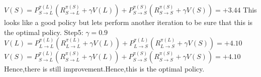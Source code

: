 \documentclass{article}
\begin{document}
$V(S)=P_{S\to L}^{\pi(L)}(R_{S\to L}^{\pi(S)}+\gamma V(L))+P_{S\to S}^{\pi(S)}(R_{S\to S}^{\pi(S)}+\gamma V(S))=+3.44$\newline\newline
This looks like a good policy but lets perform another iteration to be sure that this is the optimal policy.\newline\newline
Step5: $\gamma=0.9$\newline\newline
$V(L)=P_{L\to L}^{\pi(L)}(R_{L\to L}^{\pi(L)}+\gamma V(L))+P_{L\to S}^{\pi(L)}(R_{L\to S}^{\pi(L)}+\gamma V(S))=+4.10$\newline\newline
$V(S)=P_{S\to L}^{\pi(L)}(R_{S\to L}^{\pi(S)}+\gamma V(L))+P_{S\to S}^{\pi(S)}(R_{S\to S}^{\pi(S)}+\gamma V(S))=+4.10$\newline\newline
Hence,there is still improvement.Hence,this is the optimal policy.
\end{document}
